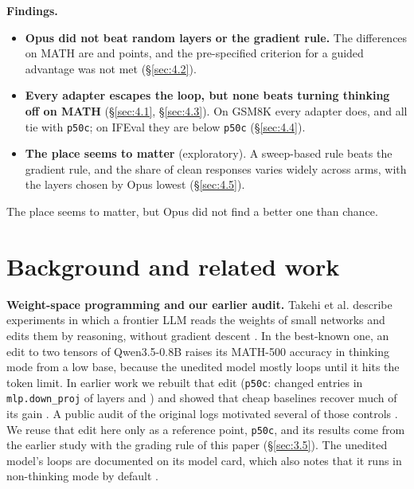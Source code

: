\documentclass[11pt]{article}
\begin{document}
\textbf{Findings.}

\begin{itemize}[nosep,leftmargin=*]
\item \textbf{Opus did not beat random layers or the gradient rule.} The differences on MATH are   and   points, and the pre-specified criterion for a guided advantage was not met (\S\ref{sec:4.2}).
\item \textbf{Every adapter escapes the loop, but none beats turning thinking off on MATH} (\S\ref{sec:4.1}, \S\ref{sec:4.3}). On GSM8K every adapter does, and all tie with \texttt{p50c}; on IFEval they are below \texttt{p50c} (\S\ref{sec:4.4}).
\item \textbf{The place seems to matter} (exploratory). A sweep-based rule beats the gradient rule, and the share of clean responses varies widely across arms, with the layers chosen by Opus lowest (\S\ref{sec:4.5}).
\end{itemize}

The place seems to matter, but Opus did not find a better one than chance.

\section{Background and related work}\label{sec:2}

\textbf{Weight-space programming and our earlier audit.} Takehi et al. describe experiments in which a frontier LLM reads the weights of small networks and edits them by reasoning, without gradient descent \citep{takehi2026}. In the best-known one, an edit to two tensors of Qwen3.5-0.8B raises its MATH-500 accuracy in thinking mode from a low base, because the unedited model mostly loops until it hits the token limit. In earlier work we rebuilt that edit (\texttt{p50c}: \MitEntries{} changed entries in \texttt{mlp.down\_\allowbreak{}proj} of layers \MitLayerA{} and \MitLayerB{}) and showed that cheap baselines recover much of its gain \citep{giraldo2026}. A public audit of the original logs motivated several of those controls \citep{messing2026}. We reuse that edit here only as a reference point, \texttt{p50c}, and its results come from the earlier study with the grading rule of this paper (\S\ref{sec:3.5}). The unedited model's loops are documented on its model card, which also notes that it runs in non-thinking mode by default \citep{qwen2026}.
\end{document}
